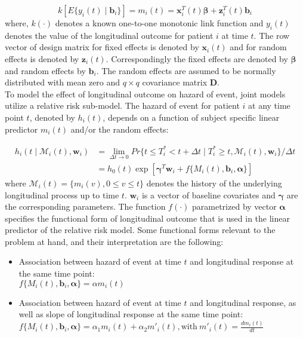 \begin{equation*}
k[E\{y_i(t) \mid \boldsymbol{b}_i\}] = m_i(t) = \boldsymbol{x}_i^T(t) \boldsymbol{\beta} + \boldsymbol{z}_i^T(t) \boldsymbol{b}_i
\end{equation*}
where, $k(\cdot)$ denotes a known one-to-one monotonic link function and $y_i(t)$ denotes the value of the longitudinal outcome for patient $i$ at time $t$. The row vector of design matrix for fixed effects is denoted by $\boldsymbol{x}_i(t)$ and for random effects is denoted by $\boldsymbol{z}_i(t)$. Correspondingly the fixed effects are denoted by $\boldsymbol{\beta}$ and random effects by $\boldsymbol{b}_i$. The random effects are assumed to be normally distributed with mean zero and $q \times q$ covariance matrix $\boldsymbol{D}$.\\

To model the effect of longitudinal outcome on hazard of event, joint models utilize a relative risk sub-model. The hazard of event for patient $i$ at any time point $t$, denoted by $h_i(t)$, depends on a function of subject specific linear predictor $m_i(t)$ and/or the random effects:

\begin{align*}
h_i(t \mid \mathcal{M}_i(t), \boldsymbol{w}_i) &= \lim_{\Delta t \to 0} Pr\{t \leq T^*_i < t + \Delta t \mid T^*_i \geq t, \mathcal{M}_i(t), \boldsymbol{w}_i\}/\Delta t\\
&=h_0(t) \exp[\boldsymbol{\gamma}^T\boldsymbol{w}_i + f\{M_i(t), \boldsymbol{b}_i, \boldsymbol{\alpha}\}]
\end{align*}
where $\mathcal{M}_i(t) = \{m_i(v), 0\leq v \leq t\}$ denotes the history of the underlying longitudinal process up to time $t$. $\boldsymbol{w}_i$ is a vector of baseline covariates and $\boldsymbol{\gamma}$ are the corresponding parameters. The function $f(\cdot)$ parametrized by vector $\boldsymbol{\alpha}$ specifies the functional form \citep{brown2009assessing,rizopoulos2012joint,taylor2013real} of longitudinal outcome that is used in the linear predictor of the relative risk model. Some functional forms relevant to the problem at hand, and their interpretation are the following: 

\begin{itemize}
\item Association between hazard of event at time $t$ and longitudinal response at the same time point:\\
$f\{M_i(t), \boldsymbol{b}_i, \boldsymbol{\alpha}\} = \alpha m_i(t)$
\item Association between hazard of event at time $t$ and longitudinal response, as well as slope of longitudinal response at the same time point:\\
$f\{M_i(t), \boldsymbol{b}_i, \boldsymbol{\alpha}\} = \alpha_1 m_i(t) + \alpha_2 m'_i(t), \text{with}\  m'_i(t) = \frac{d m_i(t)}{dt}$
\end{itemize}

